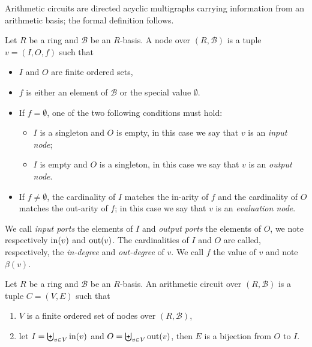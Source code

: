 Arithmetic circuits are directed acyclic multigraphs carrying
information from an arithmetic basis; the formal definition follows.

\begin{definition}
  Let $R$ be a ring and $\mathcal{B}$ be an $R$-basis. A node over
  $(R,\mathcal{B})$ is a tuple $v=(I, O, f)$ such that
  \begin{itemize}
  \item $I$ and $O$ are finite ordered sets, 
  \item $f$ is either an element of $\mathcal{B}$ or the special value
    $\emptyset$.
  \item If $f=\emptyset$, one of the two following conditions must hold:
    \begin{itemize}
    \item $I$ is a singleton and $O$ is empty, in this case we say
      that $v$ is an \emph{input node};
    \item $I$ is empty and $O$ is a singleton, in this case we say
      that $v$ is an \emph{output node}.
    \end{itemize}
  \item If $f\ne\emptyset$, the cardinality of $I$ matches the
    in-arity of $f$ and the cardinality of $O$ matches the out-arity
    of $f$; in this case we say that $v$ is an \emph{evaluation node}.
  \end{itemize}
\end{definition}

We call \emph{input ports} the elements of $I$ and \emph{output ports}
the elements of $O$, we note respectively $\operatorname{in}(v)$ and
$\operatorname{out}(v)$. The cardinalities of $I$ and $O$ are called, respectively,
the \emph{in-degree} and \emph{out-degree} of $v$.  We call $f$ the
value of $v$ and note $\beta(v)$.

\begin{definition}
  Let $R$ be a ring and $\mathcal{B}$ be an $R$-basis. An arithmetic
  circuit over $(R,\mathcal{B})$ is a tuple $C=(V,E)$ such that
  \begin{enumerate}
  \item $V$ is a finite ordered set of nodes over $(R,\mathcal{B})$,
  \item let $I=\biguplus_{v\in V}\operatorname{in}(v)$ and $O=\biguplus_{v\in
      V}\operatorname{out}(v)$, then $E$ is a bijection from $O$ to $I$.
  \end{enumerate}
\end{definition}

